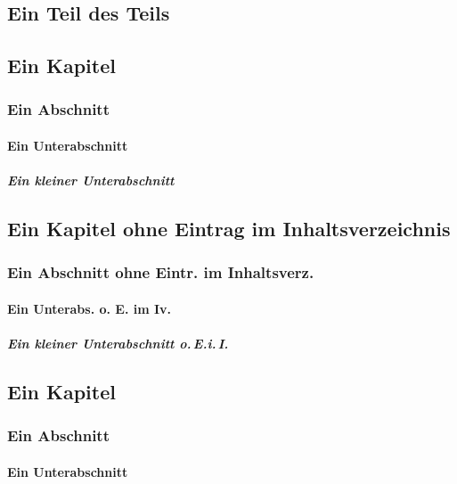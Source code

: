 
\begin{lfgwcode}{}
 
 \part{Ein Teil des Teils}
 \chapter{Ein Kapitel}
 \section{Ein Abschnitt}
 \subsection{Ein Unterabschnitt}
 \subsubsection{Ein kleiner Unterabschnitt}
 
 \chapter*{Ein Kapitel ohne Eintrag im Inhaltsverzeichnis}
 \section*{Ein Abschnitt ohne Eintr. im Inhaltsverz.}
 \subsection*{Ein Unterabs. o. E. im Iv.}
 \subsubsection*{Ein kleiner Unterabschnitt o.\,E.i.\,I.}
 
 \chapter[Kurzfssg. f. d. Kolumnentitel]{Ein Kapitel}
 \section[Kurzfssg. f. d. Kolumnentitel]{Ein Abschnitt}
 \subsection[Kurzfssg. f. d. Kolumnentitel]{Ein Unterabschnitt}
 
 
\end{lfgwcode}

